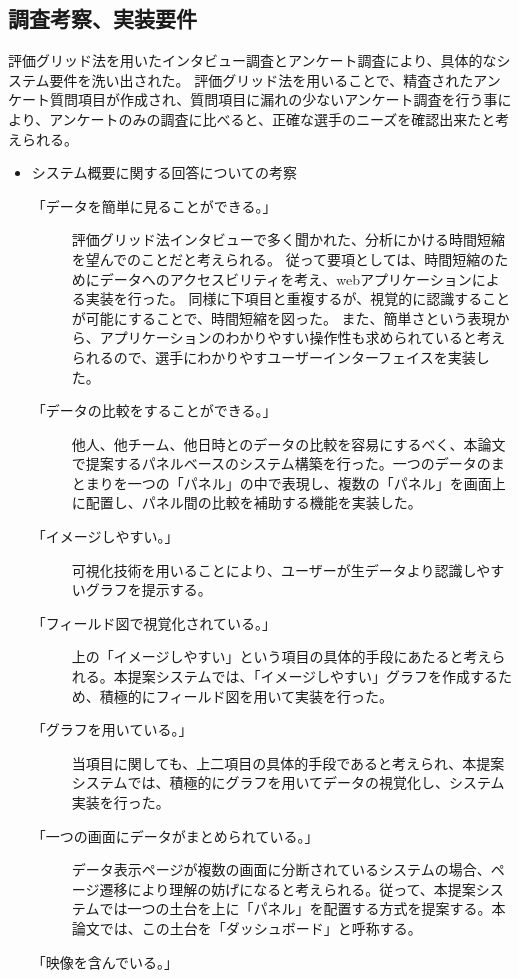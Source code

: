 \documentclass[sotsuron]{kuee}
\begin{document}
\subsection{調査考察、実装要件}
評価グリッド法を用いたインタビュー調査とアンケート調査により、具体的なシステム要件を洗い出された。
評価グリッド法を用いることで、精査されたアンケート質問項目が作成され、質問項目に漏れの少ないアンケート調査を行う事により、アンケートのみの調査に比べると、正確な選手のニーズを確認出来たと考えられる。
\begin{itemize}
	\item システム概要に関する回答についての考察
		\begin{description}
			\item [「データを簡単に見ることができる。」]
			評価グリッド法インタビューで多く聞かれた、分析にかける時間短縮を望んでのことだと考えられる。
			従って要項としては、時間短縮のためにデータへのアクセスビリティを考え、webアプリケーションによる実装を行った。
			同様に下項目と重複するが、視覚的に認識することが可能にすることで、時間短縮を図った。
			また、簡単さという表現から、アプリケーションのわかりやすい操作性も求められていると考えられるので、選手にわかりやすユーザーインターフェイスを実装した。
			\item [「データの比較をすることができる。」]
			他人、他チーム、他日時とのデータの比較を容易にするべく、本論文で提案するパネルベースのシステム構築を行った。一つのデータのまとまりを一つの「パネル」の中で表現し、複数の「パネル」を画面上に配置し、パネル間の比較を補助する機能を実装した。
			\item [「イメージしやすい。」]
			可視化技術を用いることにより、ユーザーが生データより認識しやすいグラフを提示する。
			\item [「フィールド図で視覚化されている。」]
			上の「イメージしやすい」という項目の具体的手段にあたると考えられる。本提案システムでは、「イメージしやすい」グラフを作成するため、積極的にフィールド図を用いて実装を行った。
			\item [「グラフを用いている。」]
			当項目に関しても、上二項目の具体的手段であると考えられ、本提案システムでは、積極的にグラフを用いてデータの視覚化し、システム実装を行った。
			\item [「一つの画面にデータがまとめられている。」]
			データ表示ページが複数の画面に分断されているシステムの場合、ページ遷移により理解の妨げになると考えられる。従って、本提案システムでは一つの土台を上に「パネル」を配置する方式を提案する。本論文では、この土台を「ダッシュボード」と呼称する。
			\item [「映像を含んでいる。」]

\end{description}
\end{itemize}
\end{document}
